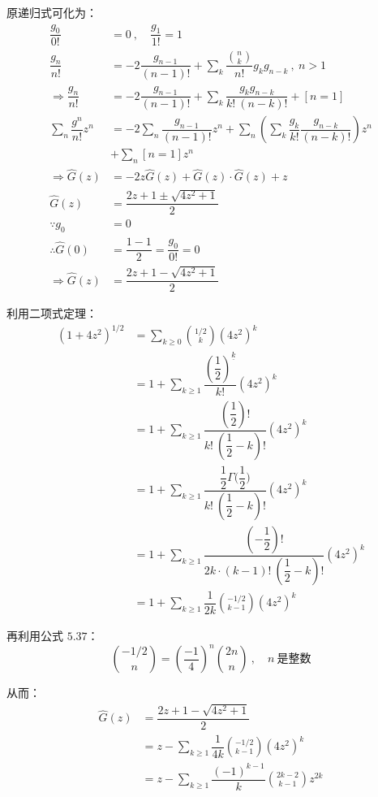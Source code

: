 原递归式可化为：
\begin{align*}
  \dfrac{g_0}{0!} &= 0 \ , \quad \dfrac{g_1}{1!} = 1 \\
  \dfrac{g_n}{n!} &= -2 \dfrac{g_{n-1}}{(n-1)!} + \sum_k \dfrac{\binom{n}{k}}{n!} g_k g_{n-k} \ , \ n > 1 \\
  \Rightarrow \dfrac{g_n}{n!} &= -2 \dfrac{g_{n-1}}{(n-1)!} + \sum_k \dfrac{g_k g_{n-k}}{k! \ (n-k)!} + [n=1] \\
  \sum_n \dfrac{g^n}{n!} z^n &= -2 \sum_n \dfrac{g_{n-1}}{(n-1)!} z^n + \sum_n \left( \sum_k \dfrac{g_k}{k!} \dfrac{g_{n-k}}{(n-k)!} \right) z^n \\
  &+ \sum_n [n=1] z^n \\
  \Rightarrow \hat{G}(z) &= -2z \hat{G}(z) + \hat{G}(z) \cdot \hat{G}(z) + z \\
  \hat{G}(z) &= \dfrac{2z + 1 \pm \sqrt{4z^2 + 1}}{2} \\
  \because g_0 &= 0 \\
  \therefore \hat{G}(0) &= \dfrac{1 - 1}{2} = \dfrac{g_0}{0!} = 0 \\
  \Rightarrow \hat{G}(z) &= \dfrac{2z + 1 - \sqrt{4z^2 + 1}}{2}
\end{align*}

利用二项式定理：
\begin{align*}
  (1+4z^2)^{1/2} &= \sum_{k \geqslant 0} \binom{1/2}{k} (4z^2)^k \\
  &= 1 + \sum_{k \geqslant 1} \dfrac{(\dfrac{1}{2})^{\underline{k}}}{k!} (4z^2)^k \\
  &= 1 + \sum_{k \geqslant 1} \dfrac{(\dfrac{1}{2}) !}{k! \ (\dfrac{1}{2} - k)!} (4z^2)^k \\
  &= 1 + \sum_{k \geqslant 1} \dfrac{\dfrac{1}{2} \Gamma{(\dfrac{1}{2}})}{k! \ (\dfrac{1}{2} - k)!} (4z^2)^k \\
  &= 1 + \sum_{k \geqslant 1} \dfrac{(- \dfrac{1}{2})!}{2k \cdot (k-1)! \ (\dfrac{1}{2} - k)!} (4z^2)^k \\
  &= 1 + \sum_{k \geqslant 1} \dfrac{1}{2k} \binom{-1/2}{k-1} (4z^2)^k
\end{align*}

再利用公式 \( 5.37 \)：
\[
  \boxed{\binom{-1/2}{n} = \left( \dfrac{-1}{4} \right)^n \binom{2n}{n} \ , \quad n \ \text{是整数}}
\]

从而：
\begin{align*}
  \hat{G}(z) &= \dfrac{2z + 1 - \sqrt{4z^2 + 1}}{2} \\
  &= z - \sum_{k \geqslant 1} \dfrac{1}{4k} \binom{-1/2}{k-1} (4z^2)^k \\
  &= z - \sum_{k \geqslant 1} \dfrac{(-1)^{k-1}}{k} \binom{2k-2}{k-1} z^{2k}
\end{align*}

